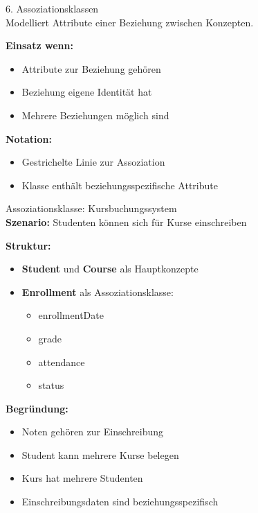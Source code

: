 \begin{concept}{6. Assoziationsklassen}\\
Modelliert Attribute einer Beziehung zwischen Konzepten.

\textbf{Einsatz wenn:}
\begin{itemize}
    \item Attribute zur Beziehung gehören
    \item Beziehung eigene Identität hat
    \item Mehrere Beziehungen möglich sind
\end{itemize}

\textbf{Notation:}
\begin{itemize}
    \item Gestrichelte Linie zur Assoziation
    \item Klasse enthält beziehungsspezifische Attribute
\end{itemize}
\end{concept}

\begin{example2}{Assoziationsklasse: Kursbuchungssystem}\\
\textbf{Szenario:} Studenten können sich für Kurse einschreiben

\textbf{Struktur:}
\begin{itemize}
    \item \textbf{Student} und \textbf{Course} als Hauptkonzepte
    \item \textbf{Enrollment} als Assoziationsklasse:
    \begin{itemize}
        \item enrollmentDate
        \item grade
        \item attendance
        \item status
    \end{itemize}
\end{itemize}

\textbf{Begründung:}
\begin{itemize}
    \item Noten gehören zur Einschreibung
    \item Student kann mehrere Kurse belegen
    \item Kurs hat mehrere Studenten
    \item Einschreibungsdaten sind beziehungsspezifisch
\end{itemize}
\end{example2}





